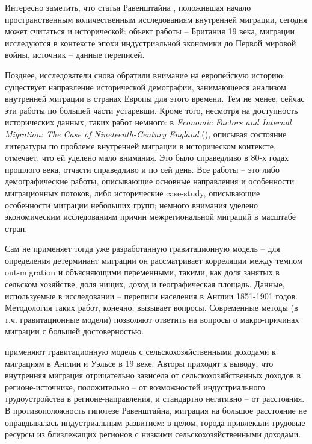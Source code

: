 \documentclass[a4paper,12pt]{article}
\begin{document}
Интересно заметить, что статья Равенштайна \citeyear{ravenstein_laws_1885}, положившая начало пространственным количественным исследованиям внутренней миграции, сегодня может считаться и исторической: объект работы -- Британия 19 века, миграции исследуются в контексте эпохи индустриальной экономики до Первой мировой войны, источник -- данные переписей. 

Позднее, исследователи снова обратили внимание на европейскую историю: существует направление исторической демографии, занимающееся анализом внутренней миграции в странах Европы для этого времени. 
Тем не менее, сейчас эти работы по большей части устаревши. Кроме того, несмотря на доступность исторических данных, таких работ немного:
\citeauthor{mcquillan_economic_1980} в \emph{Economic Factors and Internal Migration: The Case of Nineteenth-Century England} (\citeyear{mcquillan_economic_1980}), описывая состояние литературы по проблеме внутренней миграции в историческом контексте, отмечает, что ей уделено мало внимания. Это было справедливо в 80-х годах прошлого века, отчасти справедливо и по сей день.
Все работы -- это либо демографические работы, описывающие основные направления и особенности миграционных потоков, либо исторические case-study, описывающие особенности миграции небольших групп; немного внимания уделено экономическим исследованиям причин межрегиональной миграций в масштабе стран. 

Сам \citeauthor{mcquillan_economic_1980} не применяет тогда уже разработанную гравитационную модель – для определения детерминант миграции он рассматривает корреляции между темпом out-migration и объясняющими переменными, такими, как доля занятых в сельском хозяйстве, доля нищих, доход и географическая площадь. Данные, используемые в исследовании – переписи населения в Англии 1851-1901 годов. Методология таких работ, конечно, вызывает вопросы. Современные методы (в т.ч. гравитационные модели) позволяют ответить на вопросы о макро-причинах миграции с большей достоверностью.

\citet{greenwood_geographic_1973} применяют гравитационную модель с сельскохозяйственными доходами к миграциям в Англии и Уэльсе в 19 веке. Авторы приходят к выводу, что внутренняя миграция отрицательно зависела от сельскохозяйственных доходов в регионе-источнике, положительно – от возможностей индустриального трудоустройства в регионе-направления, и стандартно негативно – от расстояния. В противоположность гипотезе Равенштайна, миграция на большое расстояние не оправдывалась индустриальным развитием: в целом, города привлекали трудовые ресурсы из близлежащих регионов с низкими сельскохозяйственными доходами.
\end{document}

